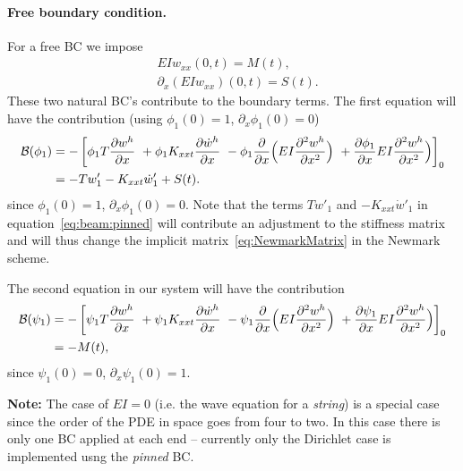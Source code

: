 \documentclass[11pt]{article}
\begin{document}
\paragraph{Free boundary condition.} For a free BC we impose
\begin{align}
&    E I w_{xx}(0,t)=M(t), \\
&   \partial_x( E I w_{xx})(0,t)=S(t) .
\end{align}
These two natural BC's contribute to the boundary terms.
The first equation will have the contribution (using $\phi_1(0)=1$, $\partial_x\phi_1(0)=0$)
\begin{align}
   \mathcal{B}(\phi_1) &= -\left[ \phi_1 T \frac{\partial w^h}{\partial x} 
                      ~ + \phi_1 K_{xxt} \frac{\partial \dot w^h}{\partial x}  
                      ~ - \phi_1 \frac{\partial}{\partial x}\Big( E I \frac{\partial^2 w^h}{\partial x^2}\Big) 
                      ~ + \frac{\partial \phi_1}{\partial x}E I \frac{\partial^2 w^h}{\partial x^2}\Big)  
                      \right]_0  \\
     &=  -T w'_1 - K_{xxt} \dot w'_1  + S(t) . \label{eq:beam:pinned}
\end{align}
since $\phi_1(0)=1$, $\partial_x\phi_1(0)=0$.
Note that the terms $T w'_1$ and $- K_{xxt} \dot w'_1$
in equation~\eqref{eq:beam:pinned} will contribute an adjustment to the stiffness matrix
and will thus change the implicit matrix~\eqref{eq:NewmarkMatrix} in the Newmark scheme.


The second equation in our system will have the contribution 
\begin{align}
   \mathcal{B}(\psi_1) &= -\left[\psi_1 T \frac{\partial w^h}{\partial x} 
                      ~ + \psi_1 K_{xxt} \frac{\partial \dot w^h}{\partial x} 
                      ~ - \psi_1 \frac{\partial}{\partial x}\Big( E I \frac{\partial^2 w^h}{\partial x^2}\Big) 
                      ~ + \frac{\partial \psi_1}{\partial x}E I \frac{\partial^2 w^h}{\partial x^2}\Big)  
                      \right]_0 \\
        &= - M(t) , 
\end{align}
since $\psi_1(0)=0$, $\partial_x\psi_1(0)=1$.

{\bf Note:} The case of $E I= 0$ (i.e. the wave equation for a {\em string}) 
is a special case since the order of the PDE in space goes from four to two. In this
case there is only one BC applied at each end -- currently only the Dirichlet case
is implemented usng the {\em pinned} BC. 


\end{document}
